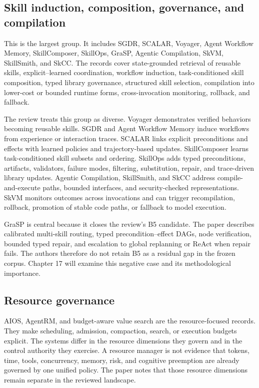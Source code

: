 \subsection{Skill induction, composition, governance, and compilation}

This is the largest group. It includes SGDR, SCALAR, Voyager, Agent Workflow Memory, SkillComposer, SkillOps, GraSP, Agentic Compilation, SkVM, SkillSmith, and SkCC. The records cover state-grounded retrieval of reusable skills, explicit--learned coordination, workflow induction, task-conditioned skill composition, typed library governance, structured skill selection, compilation into lower-cost or bounded runtime forms, cross-invocation monitoring, rollback, and fallback.

The review treats this group as diverse. Voyager demonstrates verified behaviors becoming reusable skills. SGDR and Agent Workflow Memory induce workflows from experience or interaction traces. SCALAR links explicit preconditions and effects with learned policies and trajectory-based updates. SkillComposer learns task-conditioned skill subsets and ordering. SkillOps adds typed preconditions, artifacts, validators, failure modes, filtering, substitution, repair, and trace-driven library updates. Agentic Compilation, SkillSmith, and SkCC address compile-and-execute paths, bounded interfaces, and security-checked representations. SkVM monitors outcomes across invocations and can trigger recompilation, rollback, promotion of stable code paths, or fallback to model execution.

GraSP is central because it closes the review's B5 candidate. The paper describes calibrated multi-skill routing, typed precondition--effect DAGs, node verification, bounded typed repair, and escalation to global replanning or ReAct when repair fails. The authors therefore do not retain B5 as a residual gap in the frozen corpus. Chapter 17 will examine this negative case and its methodological importance.

\subsection{Resource governance}

AIOS, AgentRM, and budget-aware value search are the resource-focused records. They make scheduling, admission, compaction, search, or execution budgets explicit. The systems differ in the resource dimensions they govern and in the control authority they exercise. A resource manager is not evidence that tokens, time, tools, concurrency, memory, risk, and cognitive preemption are already governed by one unified policy. The paper notes that those resource dimensions remain separate in the reviewed landscape.

